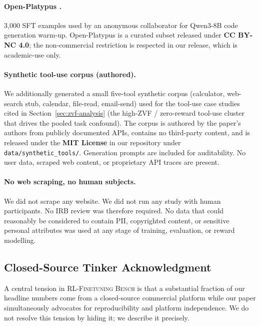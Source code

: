 \documentclass{article}
\newcommand{\ours}{\textsc{RL-Finetuning Bench}}
\begin{document}
\paragraph{Open-Platypus \cite{lee2023platypus}.}
3{,}000 SFT examples used by an anonymous collaborator for Qwen3-8B code
generation warm-up. Open-Platypus is a curated subset released under
\textbf{CC BY-NC 4.0}; the non-commercial restriction is respected in our
release, which is academic-use only.

\paragraph{Synthetic tool-use corpus (authored).}
We additionally generated a small five-tool synthetic corpus (calculator,
web-search stub, calendar, file-read, email-send) used for the tool-use
case studies cited in Section~\ref{sec:zvf-analysis} (the high-ZVF /
zero-reward tool-use cluster that drives the pooled task confound).
The corpus is authored by the paper's authors from
publicly documented APIs, contains no third-party content, and is
released under the \textbf{MIT License} in our repository under
\texttt{data/synthetic\_tools/}. Generation prompts are included for
auditability. No user data, scraped web content, or proprietary API
traces are present.

\paragraph{No web scraping, no human subjects.}
We did not scrape any website. We did not run any study with human
participants. No IRB review was therefore required. No data that could
reasonably be considered to contain PII, copyrighted content, or sensitive
personal attributes was used at any stage of training, evaluation, or
reward modelling.

\subsection{Closed-Source Tinker Acknowledgment}
\label{sec:tinker_closed}


A central tension in \ours{} is that a substantial fraction of our
headline numbers come from a closed-source commercial platform while our
paper simultaneously advocates for reproducibility and platform
independence. We do not resolve this tension by hiding it; we describe
it precisely.
\end{document}
